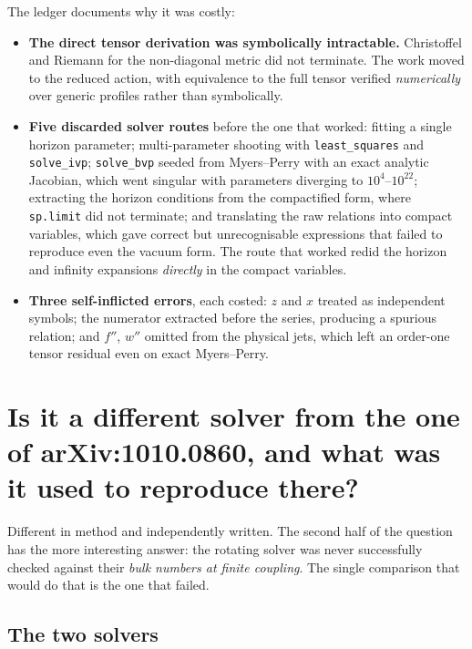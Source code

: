 \documentclass[11pt,a4paper]{article}
\newcommand{\q}[1]{\subsection*{\color{accent}#1}}
\begin{document}
The ledger documents why it was costly:
\begin{itemize}\itemsep3pt
  \item \textbf{The direct tensor derivation was symbolically intractable.}
  Christoffel and Riemann for the non-diagonal metric did not terminate. The
  work moved to the reduced action, with equivalence to the full tensor
  verified \emph{numerically} over generic profiles rather than symbolically.

  \item \textbf{Five discarded solver routes} before the one that worked:
  fitting a single horizon parameter; multi-parameter shooting with
  \texttt{least\_squares} and \texttt{solve\_ivp}; \texttt{solve\_bvp} seeded
  from Myers--Perry with an exact analytic Jacobian, which went singular with
  parameters diverging to $10^4$--$10^{22}$; extracting the horizon conditions
  from the compactified form, where \texttt{sp.limit} did not terminate; and
  translating the raw relations into compact variables, which gave correct but
  unrecognisable expressions that failed to reproduce even the vacuum form. The
  route that worked redid the horizon and infinity expansions \emph{directly}
  in the compact variables.

  \item \textbf{Three self-inflicted errors}, each costed: $z$ and $x$ treated
  as independent symbols; the numerator extracted before the series, producing
  a spurious relation; and $f''$, $w''$ omitted from the physical jets, which
  left an order-one tensor residual even on exact Myers--Perry.
\end{itemize}

\section{Is it a different solver from the one of arXiv:1010.0860, and what
was it used to reproduce there?}
\label{sec:contrast}

\noindent Different in method and independently written. The second half of the
question has the more interesting answer: the rotating solver was never
successfully checked against their \emph{bulk numbers at finite coupling}. The
single comparison that would do that is the one that failed.

\q{The two solvers}
\end{document}
